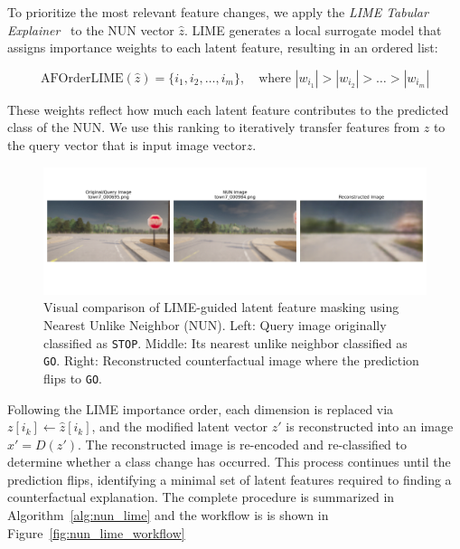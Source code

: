 To prioritize the most relevant feature changes, we apply the \textit{LIME Tabular Explainer}~\cite{Ribeiro2018} to the NUN vector \( \hat{z} \). LIME generates a local surrogate model that assigns importance weights to each latent feature, resulting in an ordered list:

\[
\text{AFOrderLIME}(\hat{z}) = \{ i_1, i_2, \dots, i_m \}, \quad \text{where } |w_{i_1}| > |w_{i_2}| > \dots > |w_{i_m}|
\]

These weights reflect how much each latent feature contributes to the predicted class of the NUN. We use this ranking to iteratively transfer features from \( \hat{z} \) to the query vector that is input image vector\( z \).

\begin{figure}[h]
    \centering
    \includegraphics[width=\linewidth]{img//masking//lime_on_latent_nun/town7_000695.png_side_by_side.png}
    \caption[Example of LIME-NUN counterfactual generation]{%
Visual comparison of LIME-guided latent feature masking using Nearest Unlike Neighbor (NUN). 
Left: Query image originally classified as \texttt{STOP}. 
Middle: Its nearest unlike neighbor classified as \texttt{GO}. 
Right: Reconstructed counterfactual image where the prediction flips to \texttt{GO}.}
    \label{fig:nun_cf_side_by_side}
\end{figure}


Following the LIME importance order, each dimension is replaced via \( z[i_k] \leftarrow \hat{z}[i_k] \), and the modified latent vector \( z' \) is reconstructed into an image \( x' = D(z') \). The reconstructed image is re-encoded and re-classified to determine whether a class change has occurred. This process continues until the prediction flips, identifying a minimal set of latent features required to finding a counterfactual explanation. The complete procedure is summarized in Algorithm~\ref{alg:nun_lime} and the workflow is is shown in Figure~\ref{fig:nun_lime_workflow}




